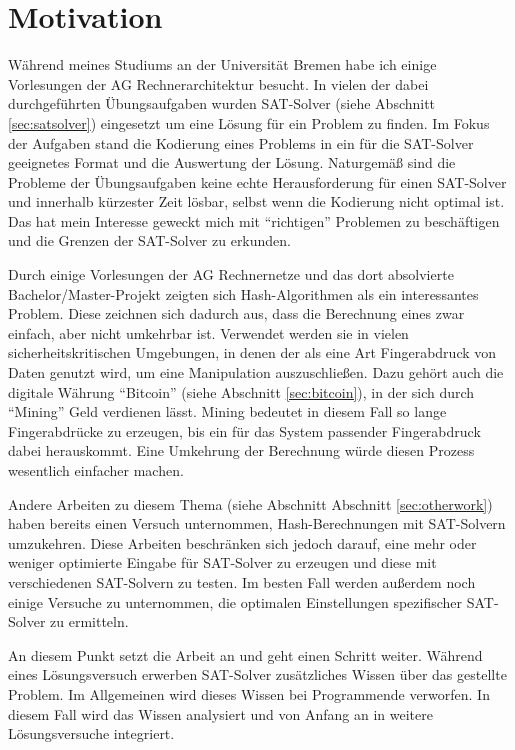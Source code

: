 \section{Motivation}

Während meines Studiums an der Universität Bremen habe ich einige Vorlesungen der AG Rechnerarchitektur besucht.
In vielen der dabei durchgeführten Übungsaufgaben wurden SAT-Solver (siehe Abschnitt \ref{sec:satsolver}) eingesetzt
um eine Lösung für ein Problem zu finden. Im Fokus der Aufgaben stand die Kodierung eines Problems in ein für die
SAT-Solver geeignetes Format und die Auswertung der Lösung. Naturgemäß sind die Probleme der Übungsaufgaben keine
echte Herausforderung für einen SAT-Solver und innerhalb kürzester Zeit lösbar, selbst wenn die Kodierung nicht optimal
ist. Das hat mein Interesse geweckt mich mit "`richtigen"' Problemen zu beschäftigen und die Grenzen der SAT-Solver
zu erkunden.

Durch einige Vorlesungen der AG Rechnernetze und das dort absolvierte Bachelor/Master-Projekt zeigten sich Hash-Algorithmen
als ein interessantes Problem. Diese zeichnen sich dadurch aus, dass die Berechnung eines  zwar einfach, aber nicht
umkehrbar ist. Verwendet werden sie in vielen sicherheitskritischen Umgebungen, in denen der  als eine Art Fingerabdruck
von Daten genutzt wird, um eine Manipulation auszuschließen. Dazu gehört auch die digitale Währung "`Bitcoin"' (siehe Abschnitt
\ref{sec:bitcoin}), in der sich durch "`Mining"' Geld verdienen lässt. Mining bedeutet in diesem Fall so lange Fingerabdrücke
zu erzeugen, bis ein für das System passender Fingerabdruck dabei herauskommt. Eine Umkehrung der Berechnung würde diesen
Prozess wesentlich einfacher machen.

Andere Arbeiten zu diesem Thema (siehe Abschnitt Abschnitt \ref{sec:otherwork}) haben bereits einen Versuch unternommen,
Hash-Berechnungen mit SAT-Solvern umzukehren. Diese Arbeiten beschränken sich jedoch darauf, eine mehr oder weniger optimierte
Eingabe für SAT-Solver zu erzeugen und diese mit verschiedenen SAT-Solvern zu testen. Im besten Fall werden außerdem noch
einige Versuche zu unternommen, die optimalen Einstellungen spezifischer SAT-Solver zu ermitteln.

An diesem Punkt setzt die Arbeit an und geht einen Schritt weiter. Während eines Lösungsversuch erwerben SAT-Solver zusätzliches
Wissen über das gestellte Problem. Im Allgemeinen wird dieses Wissen bei Programmende verworfen. In diesem Fall wird das Wissen
analysiert und von Anfang an in weitere Lösungsversuche integriert.